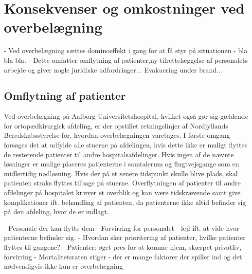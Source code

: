 \section{Konsekvenser og omkostninger ved overbelægning}
- Ved overbelægning sættes dominoeffekt i gang for at få styr på situationen
- bla bla bla. 
- Dette omfatter omflytning af patienter,ny tilrettelæggelse af personalets arbejde og giver nogle juridiske udfordringer... Evakuering under brand...

\subsection{Omflytning af patienter}
Ved overbelægning på Aalborg Universitetshospital, hvilket også gør sig gældende for ortopædkirurgisk afdeling, er der opstillet retningslinjer af Nordjyllands Beredskabsstyrelse for, hvordan overbelægningen varetages. I første omgang forsøges det at udfylde alle stuerne på afdelingen, hvis dette ikke er muligt flyttes de resterende patienter til andre hospitalsafdelinger. Hvis ingen af de nævnte løsninger er mulige placeres patienterne i samtalerum og flugtvejsgange som en midlertidig nødløsning. Hvis der på et senere tidspunkt skulle blive plads, skal patienten straks flyttes tilbage på stuerne. \cite{Beredskab2016} Overflytningen af patienter til andre afdelinger på hospitalet kræver et overblik og kan være tidskrævende samt give komplikationer ift. behandling af patienten, da patienterne ikke altid befinder sig på den afdeling, hvor de er indlagt. \cite{KILDE}


- Personale der kan flytte dem
- Forvirring for personalet - fejl ift. at vide hvor patienterne befinder sig. 
- Hvordan sker prioritering af patienter, hvilke patienter flyttes til gangene?
- Patienter: øget pres for at komme hjem, skærpet privatliv, forvirring 
- Mortalitetsraten stiger - der er mange faktorer der spiller ind og det nødvendigvis ikke kun er overbelægning


